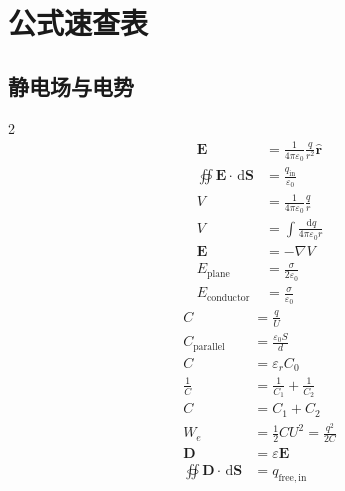 \documentclass[UTF8,zihao=-4]{ctexart}
\newcommand{\dd}{\,\mathrm d}
\newcommand{\eps}{\varepsilon}
\newcommand{\epsz}{\varepsilon_0}
\newcommand{\ve}[1]{\bm{#1}}
\newcommand{\E}{\ve E}
\newcommand{\D}{\ve D}
\newcommand{\dS}{\dd\ve S}
\newcommand{\grad}{\nabla}
\begin{document}
\section{公式速查表}

\subsection{静电场与电势}
\begin{multicols}{2}
\begin{align*}
\E&=\frac{1}{4\pi\epsz}\frac{q}{r^2}\hat{\ve r}\\
\oiint\E\cdot\dS&=\frac{q_{\mathrm{in}}}{\epsz}\\
V&=\frac{1}{4\pi\epsz}\frac{q}{r}\\
V&=\int\frac{\dd q}{4\pi\epsz r}\\
\E&=-\grad V\\
E_{\mathrm{plane}}&=\frac{\sigma}{2\epsz}\\
E_{\mathrm{conductor}}&=\frac{\sigma}{\epsz}
\end{align*}
\columnbreak
\begin{align*}
C&=\frac{q}{U}\\
C_{\mathrm{parallel}}&=\frac{\epsz S}{d}\\
C&=\eps_r C_0\\
\frac1C&=\frac1{C_1}+\frac1{C_2}\\
C&=C_1+C_2\\
W_e&=\frac12CU^2=\frac{q^2}{2C}\\
\D&=\eps\E\\
\oiint\D\cdot\dS&=q_{\mathrm{free,in}}
\end{align*}
\end{multicols}
\end{document}
